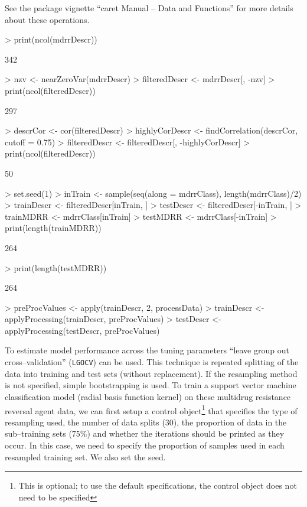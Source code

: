 \documentclass[12pt]{article}
\begin{document}
See the package vignette ``caret Manual -- Data and Functions'' for more details about these operations.

\begin{small}
\begin{Schunk}
\begin{Sinput}
> print(ncol(mdrrDescr))
\end{Sinput}
\begin{Soutput}
[1] 342
\end{Soutput}
\begin{Sinput}
> nzv <- nearZeroVar(mdrrDescr)
> filteredDescr <- mdrrDescr[, -nzv]
> print(ncol(filteredDescr))
\end{Sinput}
\begin{Soutput}
[1] 297
\end{Soutput}
\begin{Sinput}
> descrCor <- cor(filteredDescr)
> highlyCorDescr <- findCorrelation(descrCor, cutoff = 0.75)
> filteredDescr <- filteredDescr[, -highlyCorDescr]
> print(ncol(filteredDescr))
\end{Sinput}
\begin{Soutput}
[1] 50
\end{Soutput}
\begin{Sinput}
> set.seed(1)
> inTrain <- sample(seq(along = mdrrClass), length(mdrrClass)/2)
> trainDescr <- filteredDescr[inTrain, ]
> testDescr <- filteredDescr[-inTrain, ]
> trainMDRR <- mdrrClass[inTrain]
> testMDRR <- mdrrClass[-inTrain]
> print(length(trainMDRR))
\end{Sinput}
\begin{Soutput}
[1] 264
\end{Soutput}
\begin{Sinput}
> print(length(testMDRR))
\end{Sinput}
\begin{Soutput}
[1] 264
\end{Soutput}
\begin{Sinput}
> preProcValues <- apply(trainDescr, 2, processData)
> trainDescr <- applyProcessing(trainDescr, preProcValues)
> testDescr <- applyProcessing(testDescr, preProcValues)
\end{Sinput}
\end{Schunk}
\end{small}

To estimate model performance across the tuning parameters ``leave group out cross--validation'' (\texttt{LGOCV}) can be used. This technique is repeated splitting of the data into training and test sets (without replacement). If the resampling method is not specified, simple bootstrapping is used. To train a support vector machine classification model (radial basis function kernel) on these multidrug resistance reversal agent data, we can first setup a control object\footnote{This is optional; to use the default specifications, the control object does not need to be specified} that specifies the type of resampling used, the number of data splits (30), the proportion of data in the sub--training sets (75$\%$) and whether the iterations should be printed as they occur. In this case, we need to specify the proportion of samples used in each resampled training set. We also set the seed.
\end{document}
